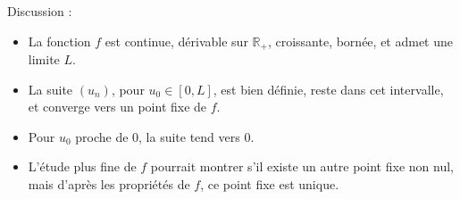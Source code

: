 \documentclass[10pt,a4paper]{article}
\begin{document}
\q Discussion :
\begin{itemize}
    \item La fonction \( f \) est continue, dérivable sur \( \mathbb{R}_+ \), croissante, bornée, et
    admet une limite \( L \).
    \item La suite \( (u_n) \), pour \( u_0 \in [0, L] \), est bien définie, reste dans cet
    intervalle, et converge vers un point fixe de \( f \).
    \item Pour \( u_0 \) proche de 0, la suite tend vers 0.
    \item L'étude plus fine de \( f \) pourrait montrer s'il existe un autre point fixe non nul,
    mais d'après les propriétés de \( f \), ce point fixe est unique.
\end{itemize}
\end{document}
